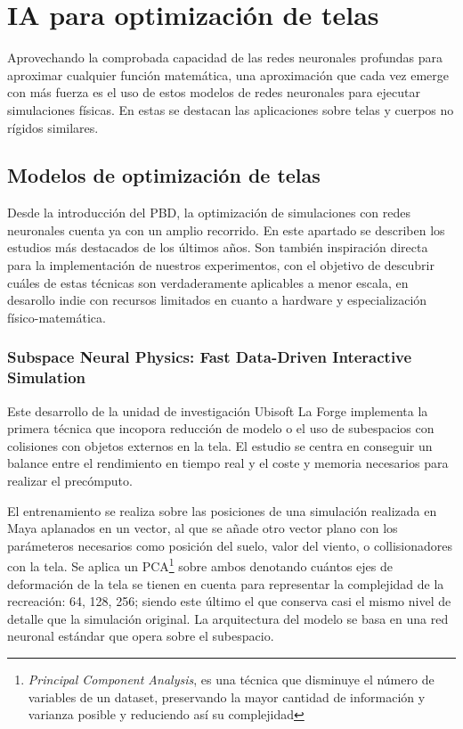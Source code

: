 \section{IA para optimización de telas}
Aprovechando la comprobada capacidad de las redes neuronales profundas para aproximar cualquier función matemática, una aproximación que cada vez emerge con más fuerza es el uso de estos modelos de redes neuronales para ejecutar simulaciones físicas. En estas se destacan las aplicaciones sobre telas y cuerpos no rígidos similares.

\subsection{Modelos de optimización de telas}
Desde la introducción del PBD, la optimización de simulaciones con redes neuronales cuenta ya con un amplio recorrido. En este apartado se describen los estudios más destacados de los últimos años. Son también inspiración directa para la implementación de nuestros experimentos, con el objetivo de descubrir cuáles de estas técnicas son verdaderamente aplicables a menor escala, en desarollo indie con recursos limitados en cuanto a hardware y especialización físico-matemática.

\subsubsection{Subspace Neural Physics: Fast Data-Driven Interactive Simulation}
Este desarrollo de la unidad de investigación Ubisoft La Forge  \cite{holden_subspace_2019} implementa la primera técnica que incopora reducción de modelo o el uso de subespacios con colisiones con objetos externos en la tela. El estudio se centra en conseguir un balance entre el rendimiento en tiempo real y el coste y memoria necesarios para realizar el precómputo. \newline

El entrenamiento se realiza sobre las posiciones de una simulación realizada en Maya aplanados en un vector, al que se añade otro vector plano con los parámeteros necesarios como posición del suelo, valor del viento, o collisionadores con la tela. Se aplica un PCA\footnote{\textit{Principal Component Analysis}, es una técnica que disminuye el número de variables de un dataset, preservando la mayor cantidad de información y varianza posible y reduciendo así su complejidad} sobre ambos denotando cuántos ejes de deformación de la tela se tienen en cuenta para representar la complejidad de la recreación: 64, 128, 256; siendo este último el que conserva casi el mismo nivel de detalle que la simulación original. La arquitectura del modelo se basa en una red neuronal estándar que opera sobre el subespacio.\newline

